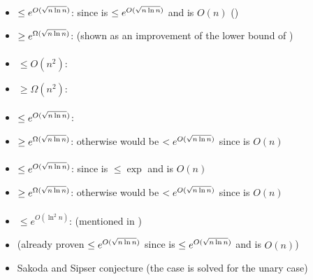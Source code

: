 \paragraph{\TDFA{}\tto\ONFA}\label{cost:2DFAto1NFAu}
\begin{itemize}
	\item $\le e^{O(\sqrt{n\ln n})}$: since \hyperref[cost:2DFAto1DFAu]{\TDFA{}\tto\ODFA} is $\le e^{O(\sqrt{n\ln n})}$ and \ODFA\tto\ONFA is $O(n)$ (\cite{Chr86})
	\item $\ge e^{\Omega(\sqrt{n\ln n})}$: \cite{Chr86} (shown as an improvement of the lower bound of \hyperref[cost:2DFAto1DFAu]{\TDFA{}\tto\ODFA})
\end{itemize}
\paragraph{\ONFA{}\tto\TDFA}\label{cost:1NFAto2DFAu}
\begin{itemize}
	\item $\le O(n^2)$: \cite{Chr86}
	\item $\ge \Omega(n^2)$: \cite{Chr86}
\end{itemize}
\paragraph{\TNFA{}\tto\ODFA}\label{cost:2NFAto1DFAu}
\begin{itemize}
	\item $\le e^{O(\sqrt{n\ln n})}$: \cite{MerPig01}
	\item $\ge e^{\Omega(\sqrt{n\ln n})}$: otherwise \hyperref[cost:2DFAto1DFAu]{\TDFA{}\tto\ODFA} would be $<e^{O(\sqrt{n\ln n})}$ since \TDFA\tto\TNFA is $O(n)$
\end{itemize}
\paragraph{\TNFA{}\tto\ONFA}
\begin{itemize}
	\item $\le e^{O(\sqrt{n\ln n})}$: since \hyperref[cost:2NFAto1DFAu]{\TNFA{}\tto\ODFA} is $\le\exp$ and \ODFA\tto\ONFA is $O(n)$
	\item $\ge e^{\Omega(\sqrt{n\ln n})}$: otherwise \hyperref[cost:2DFAto1NFAu]{\TDFA{}\tto\ONFA} would be $<e^{O(\sqrt{n\ln n})}$ since \TDFA\tto\TNFA is $O(n)$
\end{itemize}
\paragraph{\TNFA{}\tto\TDFA}\label{cost:2NFAto2DFAu}
\begin{itemize}
	\item $\le e^{O(\ln^2n)}$: \cite{GefMer+03} (mentioned in \cite{Pig15})
	\item (already proven $\le e^{O(\sqrt{n\ln n})}$ since \hyperref[cost:2NFAto1DFAu]{\TNFA{}\tto\ODFA} is $\le e^{O(\sqrt{n\ln n})}$ and \ODFA\tto\TDFA is $O(n)$)
	\item Sakoda and Sipser conjecture (the case \hyperref[cost:1NFAto2DFAu]{\ONFA{}\tto\TDFA} is solved for the unary case)
\end{itemize}


